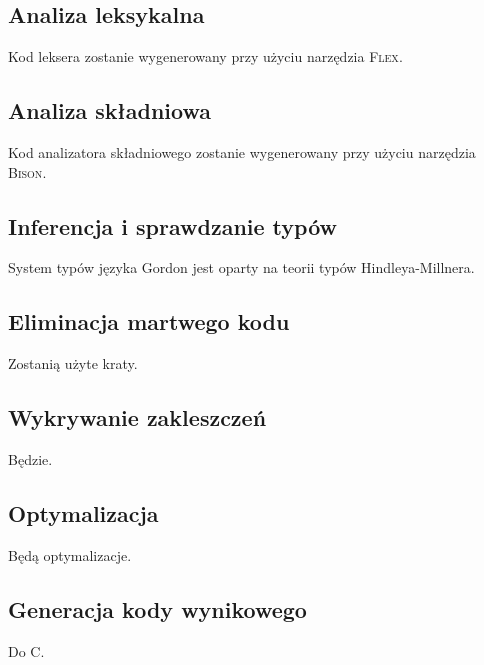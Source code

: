 \documentclass{documentation}
\begin{document}
\subsection{Analiza leksykalna}
Kod leksera zostanie wygenerowany przy użyciu narzędzia \textsc{Flex}.

\subsection{Analiza składniowa}
Kod analizatora składniowego zostanie wygenerowany przy użyciu narzędzia \textsc{Bison}.

\subsection{Inferencja i sprawdzanie typów}
System typów języka Gordon jest oparty na teorii typów Hindleya-Millnera.

\subsection{Eliminacja martwego kodu}
Zostanią użyte kraty.

\subsection{Wykrywanie zakleszczeń}
Będzie.

\subsection{Optymalizacja}
Będą optymalizacje.

\subsection{Generacja kody wynikowego}
Do C.
\end{document}
